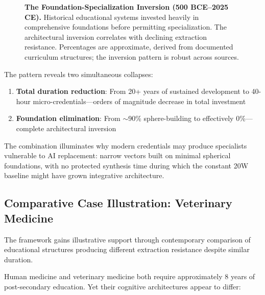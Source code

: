 \begin{figure}[htbp]
    \caption{\textbf{The Foundation-Specialization Inversion (500 BCE--2025 CE).} Historical educational systems invested heavily in comprehensive foundations before permitting specialization. The architectural inversion correlates with declining extraction resistance. Percentages are approximate, derived from documented curriculum structures; the inversion pattern is robust across sources.}
    \label{fig:foundation-specialization}
\end{figure}

The pattern reveals two simultaneous collapses:

\begin{enumerate}
    \item \textbf{Total duration reduction}: From 20+ years of sustained development to 40-hour micro-credentials—orders of magnitude decrease in total investment
    \item \textbf{Foundation elimination}: From $\sim$90\% sphere-building to effectively 0\%—complete architectural inversion
\end{enumerate}

The combination illuminates why modern credentials may produce specialists vulnerable to AI replacement: narrow vectors built on minimal spherical foundations, with no protected synthesis time during which the constant 20W baseline might have grown integrative architecture.

\subsection{Comparative Case Illustration: Veterinary Medicine}

The framework gains illustrative support through contemporary comparison of educational structures producing different extraction resistance despite similar duration.

Human medicine and veterinary medicine both require approximately 8 years of post-secondary education. Yet their cognitive architectures appear to differ:

